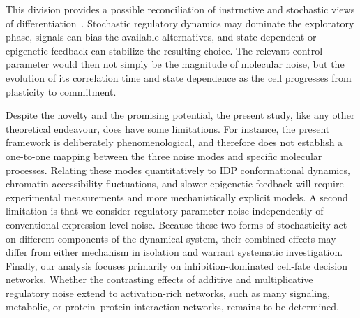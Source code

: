\documentclass[11pt]{article}
\begin{document}
This division provides a possible reconciliation of instructive and stochastic views of differentiation~\cite{Enver1998DoDice, Safina2024NewGenomics}. Stochastic regulatory dynamics may dominate the exploratory phase, signals can bias the available alternatives, and state-dependent or epigenetic feedback can stabilize the resulting choice. The relevant control parameter would then not simply be the magnitude of molecular noise, but the evolution of its correlation time and state dependence as the cell progresses from plasticity to commitment.

Despite the novelty and the promising potential, the present study, like any other theoretical endeavour, does have some limitations. For instance, the present framework is deliberately phenomenological, and therefore does not establish a one-to-one mapping between the three noise modes and specific molecular processes. Relating these modes quantitatively to IDP conformational dynamics, chromatin-accessibility fluctuations, and slower epigenetic feedback will require experimental measurements and more mechanistically explicit models. A second limitation is that we consider regulatory-parameter noise independently of conventional expression-level noise. Because these two forms of stochasticity act on different components of the dynamical system, their combined effects may differ from either mechanism in isolation and warrant systematic investigation. Finally, our analysis focuses primarily on inhibition-dominated cell-fate decision networks. Whether the contrasting effects of additive and multiplicative regulatory noise extend to activation-rich networks, such as many signaling, metabolic, or protein--protein interaction networks, remains to be determined.
\end{document}
